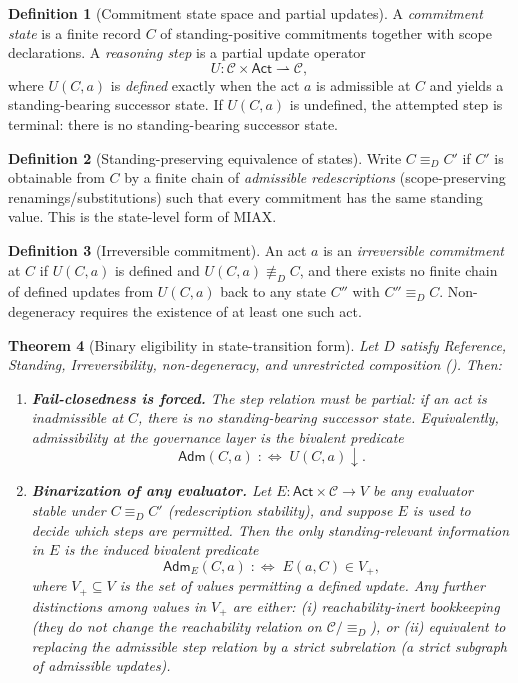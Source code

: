\documentclass[11pt]{article}
\newtheorem{theorem}{Theorem}[section]
\theoremstyle{definition}
\newtheorem{definition}[theorem]{Definition}
\newcommand{\Act}{\mathsf{Act}}
\newcommand{\Adm}{\mathsf{Adm}}
\newcommand{\ppar}{\rightharpoonup} %
\begin{document}
\begin{definition}[Commitment state space and partial updates]
A \emph{commitment state} is a finite record $C$ of standing-positive commitments together with scope declarations.
A \emph{reasoning step} is a partial update operator
\[
U:\mathcal{C}\times\Act \ppar \mathcal{C},
\]
where $U(C,a)$ is \emph{defined} exactly when the act $a$ is admissible at $C$ and yields a standing-bearing successor state.
If $U(C,a)$ is undefined, the attempted step is terminal: there is no standing-bearing successor state.
\end{definition}

\begin{definition}[Standing-preserving equivalence of states]
Write $C\equiv_D C'$ if $C'$ is obtainable from $C$ by a finite chain of \emph{admissible redescriptions}
(scope-preserving renamings/substitutions) such that every commitment has the same standing value.
This is the state-level form of MIAX.
\end{definition}

\begin{definition}[Irreversible commitment]
An act $a$ is an \emph{irreversible commitment} at $C$ if $U(C,a)$ is defined and
$U(C,a)\not\equiv_D C$, and there exists no finite chain of defined updates from $U(C,a)$ back to any state
$C''$ with $C''\equiv_D C$.
Non-degeneracy requires the existence of at least one such act.
\end{definition}

\begin{theorem}[Binary eligibility in state-transition form]
\label{thm:binary-state-transition}
Let $D$ satisfy Reference, Standing, Irreversibility, non-degeneracy, and unrestricted composition
().
Then:
\begin{enumerate}[label=\textbf{(S\arabic*)}, leftmargin=2.6em]
\item \textbf{Fail-closedness is forced.}
The step relation must be partial: if an act is inadmissible at $C$, there is no
standing-bearing successor state.
Equivalently, admissibility at the governance layer is the bivalent predicate
\[
\Adm(C,a)\;:\!\!\iff\; U(C,a)\downarrow.
\]
\item \textbf{Binarization of any evaluator.}
Let $E:\Act\times\mathcal{C}\to V$ be any evaluator stable under $C\equiv_D C'$
(redescription stability), and suppose $E$ is used to decide which steps are permitted.
Then the only standing-relevant information in $E$ is the induced bivalent predicate
\[
\Adm_E(C,a)\;:\!\!\iff\;E(a,C)\in V_+,
\]
where $V_+\subseteq V$ is the set of values permitting a defined update.
Any further distinctions among values in $V_+$ are either:
(i) reachability-inert bookkeeping (they do not change the reachability relation on $\mathcal{C}/\equiv_D$), or
(ii) equivalent to replacing the admissible step relation by a strict subrelation (a strict subgraph of admissible updates).
\end{enumerate}
\end{theorem}
\end{document}
